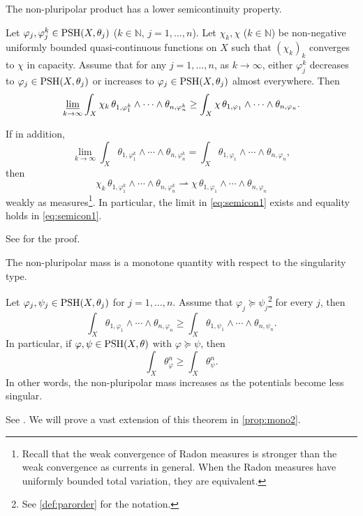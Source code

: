 The non-pluripolar product has a lower semicontinuity property.
\begin{theorem}\label{thm:semicon}
    Let $\varphi_j, \varphi_j^k\in \mathrm{PSH}(X,\theta_j)$ ($k\in \mathbb{N}$, $j=1,\ldots,n$).
    Let $\chi_k,\chi$ ($k\in \mathbb{N}$) be non-negative uniformly bounded quasi-continuous functions on $X$ such that $(\chi_k)_k$ converges to $\chi$ in capacity.
    Assume that for any $j=1,\ldots,n$, as $k\to\infty$, either $\varphi_j^k$ decreases to $\varphi_j\in \mathrm{PSH}(X,\theta_j)$ or increases to $\varphi_j\in \mathrm{PSH}(X,\theta_j)$ almost everywhere.
    Then
    \begin{equation}\label{eq:semicon1}
    \varliminf_{k\to\infty}\int_X\chi_k \,\theta_{1,\varphi_1^k}\wedge \cdots \wedge \theta_{n,\varphi_n^k} \geq \int_X \chi \,\theta_{1,\varphi_1}\wedge \cdots \wedge \theta_{n,\varphi_n}.
\end{equation}

If in addition,
\[
\lim_{k\to\infty}\int_X\theta_{1,\varphi_1^k}\wedge \cdots \wedge \theta_{n,\varphi_n^k} =\int_X \theta_{1,\varphi_1}\wedge \cdots \wedge \theta_{n,\varphi_n},
\]
then
\[
\chi_k \,\theta_{1,\varphi_1^k}\wedge \cdots \wedge \theta_{n,\varphi_n^k}\rightharpoonup \chi \,\theta_{1,\varphi_1}\wedge \cdots \wedge \theta_{n,\varphi_n}
\]
weakly as measures\footnote{Recall that the weak convergence of Radon measures is stronger than the weak convergence as currents in general. When the Radon measures have uniformly bounded total variation, they are equivalent.}. In particular, the limit in \eqref{eq:semicon1} exists and equality holds in \eqref{eq:semicon1}.
\end{theorem}
See \cite[Theorem~2.6]{DDNLsurv} for the proof.

The non-pluripolar mass is a monotone quantity with respect to the singularity type.
\begin{theorem}\label{thm:mono}
 Let $\varphi_j,\psi_j\in \mathrm{PSH}(X,\theta_j)$ for $j=1,\ldots,n$. Assume that $\varphi_j \succeq \psi_j$\footnote{See \cref{def:parorder} for the notation.} for every $j$, then
 \[
 \int_{X} \theta_{1,\varphi_1}\wedge \cdots \wedge \theta_{n,\varphi_n} \geq \int_{X}  \theta_{1,\psi_1}\wedge \cdots \wedge  \theta_{n,\psi_n}.
 \]
 In particular, if $\varphi,\psi\in \mathrm{PSH}(X,\theta)$ with $\varphi\succeq \psi$, then
 \[
 \int_X \theta_{\varphi}^n\geq  \int_X \theta_{\psi}^n.
 \]
 In other words, the non-pluripolar mass increases as the potentials become less singular.
\end{theorem}
See \cite[Theorem~1.1]{DDNL18mono}. We will prove a vast extension of this theorem in \cref{prop:mono2}.

